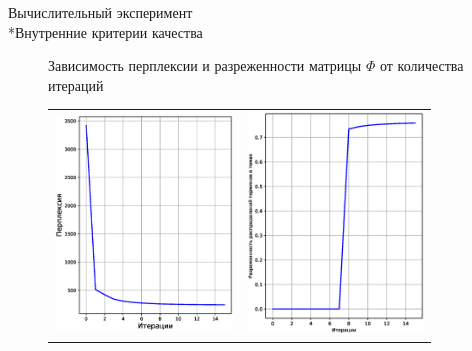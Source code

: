 \documentclass{beamer}
\begin{document}
\begin{frame}{Вычислительный эксперимент  \\*Внутренние критерии качества}
\begin{figure}
	Зависимость перплексии и разреженности матрицы $\Phi$ от количества итераций
      \vspace{0.01em}\begin{tabular}{p{4.4cm} p{4.5cm}}
        \includegraphics[width=4.7cm]{perplexity}
         &
        \includegraphics[width=4.7cm]{sparseTheta}
         \end{tabular}
\end{figure}
\end{frame}
\end{document}
